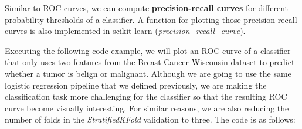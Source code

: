 \documentclass[11pt]{article}
\begin{document}
Similar to ROC curves, we can compute \textbf{precision-recall curves}
for different probability thresholds of a classifier. A function for
plotting those precision-recall curves is also implemented in
scikit-learn (\emph{precision\_recall\_curve}).

Executing the following code example, we will plot an ROC curve of a
classifier that only uses two features from the Breast Cancer Wisconsin
dataset to predict whether a tumor is belign or malignant. Although we
are going to use the same logistic regression pipeline that we defined
previously, we are making the classification task more challenging for
the classifier so that the resulting ROC curve become visually
interesting. For similar reasons, we are also reducing the number of
folds in the \emph{StratifiedKFold} validation to three. The code is as
follows:
\end{document}
